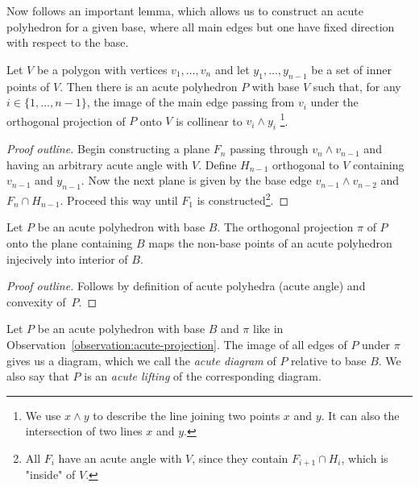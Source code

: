 Now follows an important lemma, which allows us to construct an acute polyhedron for a given base, where all main edges but one have fixed direction with respect to the base.

\begin{lemma}\label{lemma:acute-direction}
  Let $V$ be a polygon with vertices $v_1,\dots,v_n$ and let $y_1,\dots,y_{n-1}$ be a set of inner points of $V$.
  Then there is an acute polyhedron $P$ with base $V$ such that, for any $i \in \{1,\dots,n-1\}$, the image of the main edge passing from $v_i$ under the orthogonal projection of $P$ onto $V$ is collinear to $v_i \wedge y_i$ \footnote{We use $x \wedge y$ to describe the line joining two points $x$ and $y$. It can also the intersection of two lines $x$ and $y$.}.
\end{lemma}

\begin{proof}[Proof outline]
  Begin constructing a plane $F_n$ passing through $v_n \wedge v_{n-1}$ and having an arbitrary acute angle with $V$. Define $H_{n-1}$ orthogonal to $V$ containing $v_{n-1}$ and $y_{n-1}$. Now the next plane is given by the base edge $v_{n-1} \wedge v_{n-2}$ and $F_n \cap H_{n-1}$. Proceed this way until $F_1$ is constructed\footnote{All $F_i$ have an acute angle with $V$, since they contain $F_{i+1} \cap H_i$, which is "inside" of $V$.}.
\end{proof}

\begin{observation}\label{observation:acute-projection}
  Let $P$ be an acute polyhedron with base $B$.
  The orthogonal projection $\pi$ of $P$ onto the plane containing $B$ maps the non-base points of an acute polyhedron injecively into interior of $B$.
\end{observation}

\begin{proof}[Proof outline]
  Follows by definition of acute polyhedra (acute angle) and convexity of~$P$.
\end{proof}

\begin{definition}
  Let $P$ be an acute polyhedron with base $B$ and $\pi$ like in Observation~\ref{observation:acute-projection}.
  The image of all edges of $P$ under $\pi$ gives us a diagram, which we call the \emph{acute diagram} of $P$ relative to base $B$. 
  We also say that $P$ is an \emph{acute lifting} of the corresponding diagram.
\end{definition}

